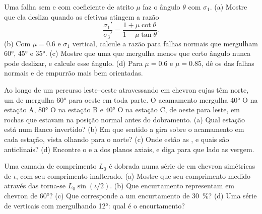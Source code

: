 \begin{exercise}[$\star\star\star$]\label{exo:b1:faults-folds-fabrics:10}
Uma falha sem  e com coeficiente de atrito $\mu$ faz o ângulo $\theta$ com $\sigma_1$. (a) Mostre que ela desliza quando as  efetivas atingem a razão
\[
  \frac{\sigma_1'}{\sigma_3'} = \frac{1 + \mu\cot\theta}{1 - \mu\tan\theta} .
\]
(b) Com $\mu = 0.6$ e $\sigma_1$ vertical, calcule a razão para falhas normais que mergulham \ang{60}, \ang{45} e \ang{35}. (c) Mostre que uma  que mergulha menos que certo ângulo nunca pode deslizar, e calcule esse ângulo. (d) Para $\mu = 0.6$ e $\mu = 0.85$, dê os  das falhas normais e de empurrão mais bem orientadas.
\end{exercise}

\begin{exercise}[$\star\star\star$]\label{exo:b1:faults-folds-fabrics:11}
Ao longo de um percurso leste--oeste atravessando  em chevron cujas  têm  norte, um  de  mergulha \ang{60} para oeste em toda parte. O acamamento mergulha \ang{40} O na estação A, \ang{80} O na estação B e \ang{40} O na estação C, de oeste para leste, em rochas que estavam na posição normal antes do dobramento. (a) Qual estação está num flanco invertido? (b) Em que sentido a  gira sobre o acamamento em cada estação, vista olhando para o norte? (c) Onde estão as , e quais são anticlinais? (d) Encontre o  e a  dos planos axiais, e diga para que lado as  vergem.
\end{exercise}

\begin{exercise}[$\star\star\star$]\label{exo:b1:faults-folds-fabrics:12}
Uma camada de comprimento $L_0$ é dobrada numa série de  em chevron simétricas de  $\iota$, com seu comprimento inalterado. (a) Mostre que seu comprimento medido através das  torna-se $L_0\sin(\iota/2)$. (b) Que encurtamento representam  em chevron de  \ang{60}? (c) Que  corresponde a um encurtamento de \qty{30}{\percent}? (d) Uma série de  verticais com  mergulhando \ang{12}: qual é o encurtamento?
\end{exercise}

